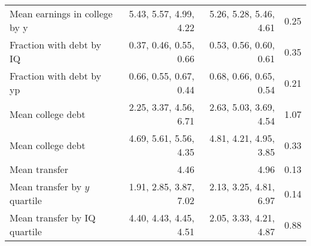 \begin{tabular}{lrrr}
Mean earnings in college by y & 5.43, 5.57, 4.99, 4.22  & 5.26, 5.28, 5.46, 4.61  & 0.25  \\ 
Fraction with debt by IQ & 0.37, 0.46, 0.55, 0.66  & 0.53, 0.56, 0.60, 0.61  & 0.35  \\ 
Fraction with debt by yp & 0.66, 0.55, 0.67, 0.44  & 0.68, 0.66, 0.65, 0.54  & 0.21  \\ 
Mean college debt & 2.25, 3.37, 4.56, 6.71  & 2.63, 5.03, 3.69, 4.54  & 1.07  \\ 
Mean college debt & 4.69, 5.61, 5.56, 4.35  & 4.81, 4.21, 4.95, 3.85  & 0.33  \\ 
Mean transfer & 4.46  & 4.96  & 0.13  \\ 
Mean transfer by $y$ quartile & 1.91, 2.85, 3.87, 7.02  & 2.13, 3.25, 4.81, 6.97  & 0.14  \\ 
Mean transfer by IQ quartile & 4.40, 4.43, 4.45, 4.51  & 2.05, 3.33, 4.21, 4.87  & 0.88  \\ 
\hline
\end{tabular}%
